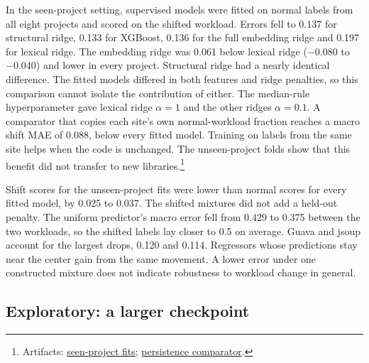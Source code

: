 \documentclass[11pt]{article}
\newcommand{\repocommit}{81d03caebe268d013b3163bcbff31cadabaaec21}
\newcommand{\repourl}{https://github.com/minggu151623/llm_profiling_research}
\newcommand{\repo}[2]{\href{\repourl/blob/\repocommit/#1}{#2}}
\newcommand{\artifacts}[1]{\footnote{Artifacts: #1.}}
\begin{document}
In the seen-project setting, supervised models were fitted on normal labels from all eight projects and scored on the shifted workload. Errors fell to 0.137 for structural ridge, 0.133 for XGBoost, 0.136 for the full embedding ridge and 0.197 for lexical ridge. The embedding ridge was 0.061 below lexical ridge ($-0.080$ to $-0.040$) and lower in every project. Structural ridge had a nearly identical difference. The fitted models differed in both features and ridge penalties, so this comparison cannot isolate the contribution of either. The median-rule hyperparameter gave lexical ridge $\alpha = 1$ and the other ridges $\alpha = 0.1$. A comparator that copies each site's own normal-workload fraction reaches a macro shift MAE of 0.088, below every fitted model. Training on labels from the same site helps when the code is unchanged. The unseen-project folds show that this benefit did not transfer to new libraries.\artifacts{\repo{experiments/study/evaluation/folds.json}{seen-project fits}; \repo{experiments/study/supplement/persistence.csv}{persistence comparator}}

Shift scores for the unseen-project fits were lower than normal scores for every fitted model, by 0.025 to 0.037. The shifted mixtures did not add a held-out penalty. The uniform predictor's macro error fell from 0.429 to 0.375 between the two workloads, so the shifted labels lay closer to 0.5 on average. Guava and jsoup account for the largest drops, 0.120 and 0.114. Regressors whose predictions stay near the center gain from the same movement. A lower error under one constructed mixture does not indicate robustness to workload change in general.

\subsection{Exploratory: a larger checkpoint}
\end{document}
